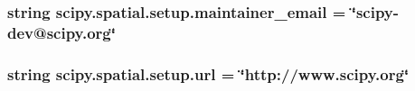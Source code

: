 \subsubsection[{maintainer\+\_\+email}]{\setlength{\rightskip}{0pt plus 5cm}string scipy.\+spatial.\+setup.\+maintainer\+\_\+email = \char`\"{}scipy-\/dev@scipy.\+org\char`\"{}}\label{namespacescipy_1_1spatial_1_1setup_a2c684b97849fa3e49146010b784715b2}
\hypertarget{namespacescipy_1_1spatial_1_1setup_a28becf286a2bc39bca319028faf4a52b}{}
\subsubsection[{url}]{\setlength{\rightskip}{0pt plus 5cm}string scipy.\+spatial.\+setup.\+url = \char`\"{}http\+://www.\+scipy.\+org\char`\"{}}\label{namespacescipy_1_1spatial_1_1setup_a28becf286a2bc39bca319028faf4a52b}
